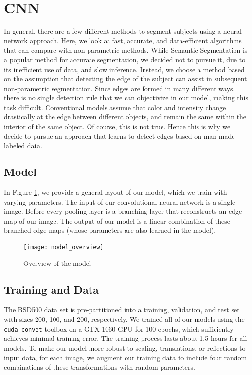 \documentclass[10pt, twocolumn, twoside]{article}
\newcommand{\squeezeup}{\vspace{-2.5mm}}
\begin{document}
\section{CNN}
\squeezeup
\squeezeup
In general, there are a few different methods to segment subjects using a neural network approach. Here, we look at fast, accurate, and data-efficient algorithms that can compare with non-parametric methods. While Semantic Segmentation is a popular method for accurate segmentation, we decided not to pursue it, due to its inefficient use of data, and slow inference. Instead, we choose a method based on the assumption that detecting the edge of the subject can assist in subsequent non-parametric segmentation. Since edges are formed in many different ways, there is no single detection rule that we can objectivize in our model, making this task difficult. Conventional models assume that color and intensity change drastically at the edge between different objects, and remain the same within the interior of the same object. Of course, this is not true. Hence this is why we decide to pursue an approach that learns to detect edges based on man-made labeled data. 

\subsection{Model}
\squeezeup

In Figure \ref{fig:2}, we provide a general layout of our model, which we train with varying parameters. The input of our convolutional neural network is a single image. Before every pooling layer is a branching layer that reconstructs an edge map of our image. The output of our model is a linear combination of these branched edge maps (whose parameters are also learned in the model).

\begin{figure}[h]
    \centering \texttt{[image: model\_overview]}
    \caption{Overview of the model}
    \label{fig:2}
\end{figure}
\squeezeup
\squeezeup

\subsection{Training and Data}
\squeezeup
The BSD500 data set is pre-partitioned into a training, validation, and test set with sizes 200, 100, and 200, respectively. We trained all of our models using the \texttt{cuda-convet} toolbox on a GTX 1060 GPU for 100 epochs, which sufficiently achieves minimal training error. The training process lasts about 1.5 hours for all models. To make our model more robust to scaling, translations, or reflections to input data, for each image, we augment our training data to include four random combinations of these transformations with random parameters. 
\end{document}
